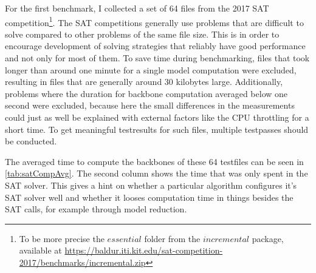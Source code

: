 For the first benchmark, I collected a set of 64 files from the 2017 SAT competition\footnote{
To be more precise the $essential$ folder from the $incremental$ package, available at \url{https://baldur.iti.kit.edu/sat-competition-2017/benchmarks/incremental.zip}
}. The SAT competitions generally use problems that are difficult to solve compared to other problems of the same file size. This is in order to encourage development of solving strategies that reliably have good performance and not only for most of them. To save time during benchmarking, files that took longer than around one minute for a single model computation were excluded, resulting in files that are generally around 30 kilobytes large. Additionally, problems where the duration for backbone computation averaged below one second were excluded, because here the small differences in the measurements could just as well be explained with external factors like the CPU throttling for a short time. To get meaningful testresults for such files, multiple testpasses should be conducted.

The averaged time to compute the backbones of these 64 testfiles can be seen in \ref{tab:satCompAvg}. The second column shows the time that was only spent in the SAT solver. This gives a hint on whether a particular algorithm configures it's SAT solver well and whether it looses computation time in things besides the SAT calls, for example through model reduction.

